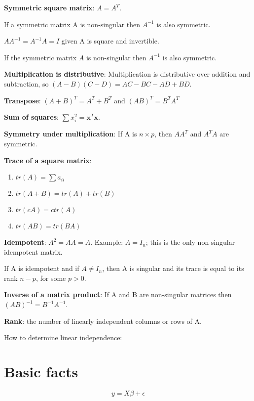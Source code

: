 \textbf{Symmetric square matrix}: $A=A^T$. 

If a symmetric matrix A is non-singular then $A^{-1}$ is also symmetric.

$AA^{-1}=A^{-1}A=I$ given A is square and invertible.
 
 If the symmetric matrix $A$ is non-singular then $A^{-1}$ is also symmetric.
 
 \textbf{Multiplication is distributive}: Multiplication is distributive over addition and subtraction, so $(A-B)(C-D)=AC -BC-AD+BD$.

\textbf{Transpose}: $(A+B)^T =A^T+B^T$ and $(AB)^T =B^TA^T$

\textbf{Sum of squares}: $\sum x_i^2 = \mathbf{x}^T \mathbf{x}$.

\textbf{Symmetry under multiplication}: If A is $n\times p$, then $AA^T$ and $A^TA$ are symmetric.




\textbf{Trace of a square matrix}: 

\begin{enumerate}
\item
$tr(A)=\sum a_{ii}$
\item
$tr(A + B) = tr(A) + tr(B)$
\item 
$tr(cA) = ctr(A)$
\item
$tr(AB) = tr(BA)$
\end{enumerate}

\textbf{Idempotent}:  $A^2 = AA = A$. Example: $A = I_n$; this is the only non-singular idempotent matrix. 

If A is idempotent and if $A\neq I_n$, then A is singular and its trace is equal to its rank $n-p$, for some $p>0$.

\textbf{Inverse of a matrix product}:
If A and B are non-singular matrices then $(AB)^{-1} = B^{-1}A^{-1}$.

\textbf{Rank}: the number of linearly independent columns or rows of A.

How to determine linear independence: 

\section{Basic facts}

\begin{equation}
y=X\beta+\epsilon
\end{equation}

